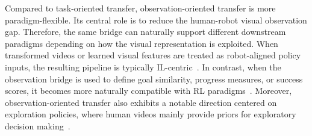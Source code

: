 \documentclass[Afour,sageh,times]{sagej}
\begin{document}
Compared to task-oriented transfer, observation-oriented transfer is more paradigm-flexible. Its central role is to reduce the human-robot visual observation gap. Therefore, the same bridge can naturally support different downstream paradigms depending on how the visual representation is exploited. When transformed videos or learned visual features are treated as robot-aligned policy inputs, the resulting pipeline is typically IL-centric~\citep{li2024ag2manip,lepert2025masquerade,li2025h2r,li2025mimicdreamer}. In contrast, when the observation bridge is used to define goal similarity, progress measures, or success scores, it becomes more naturally compatible with RL paradigms~\citep{smith2020avid,zakka2022xirl}. Moreover, observation-oriented transfer also exhibits a notable direction centered on exploration policies, where human videos mainly provide priors for exploratory decision making~\citep{chang2023look,mendonca2023structured,goswami2025world}. 
\end{document}
